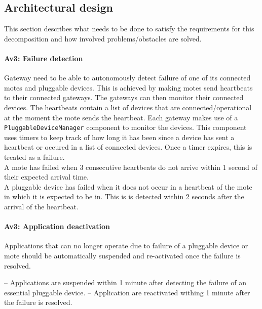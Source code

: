 \subsection{Architectural design}\label{sec:architectural-design}
    This section describes what needs to be done to satisfy the requirements for
    this decomposition and how involved problems/obstacles are solved.

    \paragraph{Av3: Failure detection}
        Gateway need to be able to autonomously detect failure of one of its
        connected motes and pluggable devices. This is achieved by making motes
        send heartbeats to their connected gateways. The gateways can
        then monitor their connected devices. The heartbeats contain a list
        of devices that are connected/operational at the moment the mote sends
        the heartbeat. Each gateway makes use of a \texttt{PluggableDeviceManager}
        component to monitor the devices. This component uses timers to keep track
        of how long it has been since a device has sent a heartbeat or occured in
        a list of connected devices. Once a timer expires, this is treated as
        a failure. \\
        A mote has failed when 3 consecutive heartbeats do not arrive within 1
        second of their expected arrival time. \\
        A pluggable device has failed when it does not occur in a heartbeat of the
        mote in which it is expected to be in. This is is detected within 2
        seconds after the arrival of the heartbeat.

    \paragraph{Av3: Application deactivation}

        Applications that can no longer operate due to failure of a pluggable
        device or mote should be automatically suspended and re-activated once the failure is resolved.

            – Applications are suspended within 1 minute after detecting the failure of an essential pluggable
            device.
            – Application are reactivated withing 1 minute after the failure is resolved.

